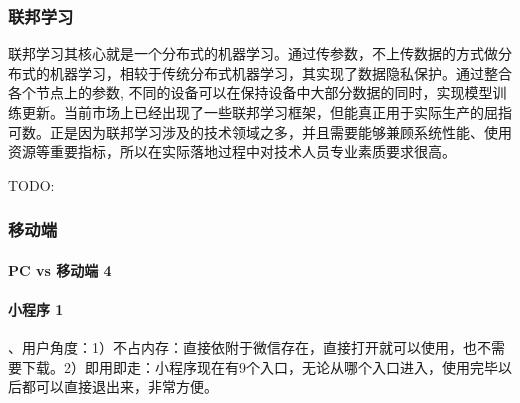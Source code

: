 \documentclass[letterpaper,10pt,english]{sphinxmanual}
\begin{document}
\subsubsection{联邦学习}
\label{\detokenize{chapter_AI_dive/Federated Learning:id1}}\label{\detokenize{chapter_AI_dive/Federated Learning::doc}}
联邦学习其核心就是一个分布式的机器学习。通过传参数，不上传数据的方式做分布式的机器学习，相较于传统分布式机器学习，其实现了数据隐私保护。通过整合各个节点上的参数,
不同的设备可以在保持设备中大部分数据的同时，实现模型训练更新。当前市场上已经出现了一些联邦学习框架，但能真正用于实际生产的屈指可数。正是因为联邦学习涉及的技术领域之多，并且需要能够兼顾系统性能、使用资源等重要指标，所以在实际落地过程中对技术人员专业素质要求很高。%
\begin{footnote}[969]\sphinxAtStartFootnote
{}
%
\end{footnote}

TODO:


\subsubsection{移动端}
\label{\detokenize{chapter_AI_dive/mobile:id1}}\label{\detokenize{chapter_AI_dive/mobile::doc}}

\paragraph{PC vs 移动端 4\sphinxfootnotemark[970]}
\label{\detokenize{chapter_AI_dive/mobile:pc-vs-4}}%
\begin{footnotetext}[970]\sphinxAtStartFootnote
{}
%
\end{footnotetext}\ignorespaces 
\begin{center}\end{center}  


\paragraph{小程序 1\sphinxfootnotemark[971]}
\label{\detokenize{chapter_AI_dive/mobile:id2}}%
\begin{footnotetext}[971]\sphinxAtStartFootnote
{}
%
\end{footnotetext}、用户角度：1）不占内存：直接依附于微信存在，直接打开就可以使用，也不需要下载。2）即用即走：小程序现在有9个入口，无论从哪个入口进入，使用完毕以后都可以直接退出来，非常方便。
\end{document}
